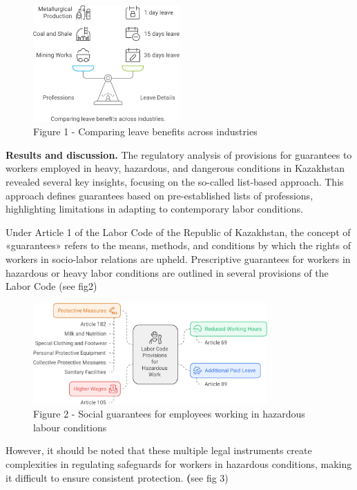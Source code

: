 \begin{figure}[H]
	\centering
	\includegraphics[width=0.5\textwidth]{media/gorn/image2}
	\caption*{Figure 1 - Comparing leave benefits across industries}
\end{figure}


\begin{multicols}{2}
{\bfseries Results and discussion.} The regulatory analysis of provisions for
guarantees to workers employed in heavy, hazardous, and dangerous
conditions in Kazakhstan revealed several key insights, focusing on the
so-called list-based approach. This approach defines guarantees based on
pre-established lists of professions, highlighting limitations in
adapting to contemporary labor conditions.

Under Article 1 of the Labor Code of the Republic of Kazakhstan, the
concept of «guarantees» refers to the means, methods, and conditions by
which the rights of workers in socio-labor relations are upheld.
Prescriptive guarantees for workers in hazardous or heavy labor
conditions are outlined in several provisions of the Labor Code (see
fig2)
\end{multicols}

\begin{figure}[H]
	\centering
	\includegraphics[width=0.8\textwidth]{media/gorn/image3}
	\caption*{Figure 2 - Social guarantees for employees working in hazardous labour conditions}
\end{figure}

However, it should be noted that these multiple legal instruments create
complexities in regulating safeguards for workers in hazardous
conditions, making it difficult to ensure consistent protection.
{\bfseries (}see fig 3)

